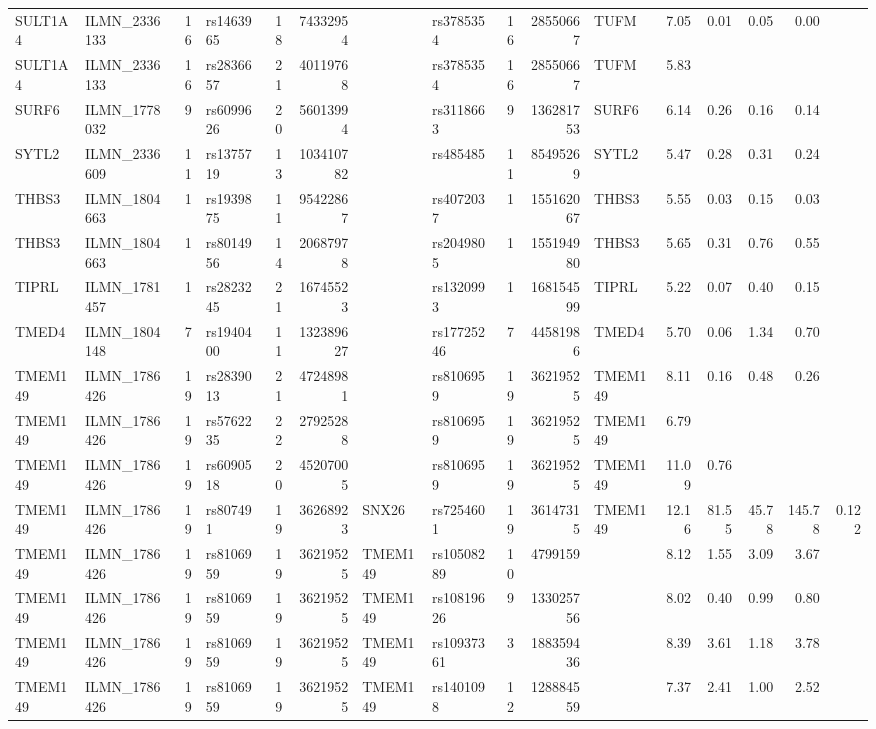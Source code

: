 \documentclass{article}
\begin{document}
\begin{landscape}
{\begin{ThreePartTable}
\begin{longtable}{|llr|lrrl|lrrl|rrrr|r|}
SULT1A4 & ILMN\_2336133 & 16 & rs1463965 & 18 & 74332954 &  & rs3785354 & 16 & 28550667 & TUFM & 7.05 & 0.01 & 0.05 & 0.00 &  \\
SULT1A4 & ILMN\_2336133 & 16 & rs2836657 & 21 & 40119768 &  & rs3785354 & 16 & 28550667 & TUFM & 5.83 &  &  &  &  \\
SURF6 & ILMN\_1778032 & 9 & rs6099626 & 20 & 56013994 &  & rs3118663 & 9 & 136281753 & SURF6 & 6.14 & 0.26 & 0.16 & 0.14 &  \\
SYTL2 & ILMN\_2336609 & 11 & rs1375719 & 13 & 103410782 &  & rs485485 & 11 & 85495269 & SYTL2 & 5.47 & 0.28 & 0.31 & 0.24 &  \\
THBS3 & ILMN\_1804663 & 1 & rs1939875 & 11 & 95422867 &  & rs4072037 & 1 & 155162067 & THBS3 & 5.55 & 0.03 & 0.15 & 0.03 &  \\
THBS3 & ILMN\_1804663 & 1 & rs8014956 & 14 & 20687978 &  & rs2049805 & 1 & 155194980 & THBS3 & 5.65 & 0.31 & 0.76 & 0.55 &  \\
TIPRL & ILMN\_1781457 & 1 & rs2823245 & 21 & 16745523 &  & rs1320993 & 1 & 168154599 & TIPRL & 5.22 & 0.07 & 0.40 & 0.15 &  \\
TMED4 & ILMN\_1804148 & 7 & rs1940400 & 11 & 132389627 &  & rs17725246 & 7 & 44581986 & TMED4 & 5.70 & 0.06 & 1.34 & 0.70 &  \\
TMEM149 & ILMN\_1786426 & 19 & rs2839013 & 21 & 47248981 &  & rs8106959 & 19 & 36219525 & TMEM149 & 8.11 & 0.16 & 0.48 & 0.26 &  \\
TMEM149 & ILMN\_1786426 & 19 & rs5762235 & 22 & 27925288 &  & rs8106959 & 19 & 36219525 & TMEM149 & 6.79 &  &  &  &  \\
TMEM149 & ILMN\_1786426 & 19 & rs6090518 & 20 & 45207005 &  & rs8106959 & 19 & 36219525 & TMEM149 & 11.09 & 0.76 &  &  &  \\
TMEM149 & ILMN\_1786426 & 19 & rs807491 & 19 & 36268923 & SNX26 & rs7254601 & 19 & 36147315 & TMEM149 & 12.16 & 81.55 & 45.78 & 145.78 & 0.122 \\
TMEM149 & ILMN\_1786426 & 19 & rs8106959 & 19 & 36219525 & TMEM149 & rs10508289 & 10 & 4799159 &  & 8.12 & 1.55 & 3.09 & 3.67 &  \\
TMEM149 & ILMN\_1786426 & 19 & rs8106959 & 19 & 36219525 & TMEM149 & rs10819626 & 9 & 133025756 &  & 8.02 & 0.40 & 0.99 & 0.80 &  \\
TMEM149 & ILMN\_1786426 & 19 & rs8106959 & 19 & 36219525 & TMEM149 & rs10937361 & 3 & 188359436 &  & 8.39 & 3.61 & 1.18 & 3.78 &  \\
TMEM149 & ILMN\_1786426 & 19 & rs8106959 & 19 & 36219525 & TMEM149 & rs1401098 & 12 & 128884559 &  & 7.37 & 2.41 & 1.00 & 2.52 &  \\

\end{longtable}
\end{ThreePartTable}}
\end{landscape}
\end{document}
